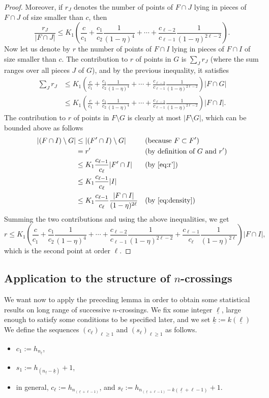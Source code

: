 \documentclass[10pt]{amsart}
\theoremstyle{definition}\newtheorem{defi}[theo]{Definition}\newtheorem{rema}[theo]{Remark}\newtheorem{exam}[theo]{Example}\newtheorem{exem}[theo]{Example}\newtheorem{nota}[theo]{Notation}
\newcommand{\egdef}{:=}
\newcommand{\lb}{\underline{\ell}}
\newcommand{\kb}{\underline{k}}
\begin{document}
\begin{proof}
Moreover, if $r_J$ denotes the number of points of $F\cap J$ lying in pieces of $F\cap J$ of size smaller than $c$, then
\[
\frac{r_J}{|F\cap J|} \le K_1\left(\frac{c}{c_1} + \frac{c_1}{c_2}
\frac{1}{(1-\eta)^4} + \cdots + \frac{c_{\ell-2}}{c_{\ell-1}}
\frac{1}{(1-\eta)^{2{\ell-2}}}\right).
\]
Now let us denote by $r$ the number of points of $F\cap I$ lying in pieces of $F\cap I$ of size smaller than $c$. The contribution to $r$ of points in $G$ is $\sum_J r_J$ (where the sum ranges over all pieces $J$ of $G$), and by the previous inequality, it satisfies
\begin{align*}
\sum_J r_J & \le K_1\left(\frac{c}{c_1} + \frac{c_1}{c_2} \frac{1}{(1-\eta)^4} + \cdots + \frac{c_{\ell-2}}{c_{\ell-1}}
\frac{1}{(1-\eta)^{2{\ell-2}}}\right) |F\cap G| \\
& \le K_1\left(\frac{c}{c_1} + \frac{c_1}{c_2}
\frac{1}{(1-\eta)^4} + \cdots + \frac{c_{\ell-2}}{c_{\ell-1}}
\frac{1}{(1-\eta)^{2{\ell-2}}}\right) |F\cap I|.
\end{align*}
The contribution to $r$ of points in $F\setminus G$ is clearly at most $|F\setminus G|$, which can be bounded above as follows
\begin{align*}
|(F\cap I)\setminus G| & \le |(F'\cap I)\setminus G| &&\text{(because $F\subset F'$)}\\
& = r' &&\text{(by definition of $G$ and $r'$)}\\
& \le K_1 \frac{c_{\ell-1}}{c_\ell}|F'\cap I| &&\text{(by~\eqref{eq:r'})}\\
& \le K_1 \frac{c_{\ell-1}}{c_\ell}|I| \\
& \le K_1 \frac{c_{\ell-1}}{c_\ell} \frac{|F\cap I|}{(1-\eta)^{2\ell}} &&\text{(by~\eqref{eq:density})}
\end{align*}
Summing the two contributions and using the above inequalities, we get
\[
r \le K_1\left(\frac{c}{c_1} + \frac{c_1}{c_2}
\frac{1}{(1-\eta)^4} + \cdots + \frac{c_{\ell-2}}{c_{\ell-1}}
\frac{1}{(1-\eta)^{2{\ell-2}}} + \frac{c_{\ell-1}}{c_\ell} \frac{1}{(1-\eta)^{2\ell}} \right) |F\cap I|,
\]
which is the second point at order $\ell$.
\end{proof}

\subsection{Application to the structure of \texorpdfstring{$n$}{n}-crossings}\label{sec:application}

We want now to apply the preceding lemma in order to obtain some statistical results on long range of successive $n$-crossings. We fix some integer $\lb$, large enough to satisfy some conditions to be specified later, and we set $\kb\egdef k(\lb)$ We define\pagebreak{} the sequences ${(c_\ell)}_{\ell\ge1}$ and ${(s_\ell)}_{\ell\ge1}$ as follows.
\begin{itemize}
\item $c_1\egdef h_{n_{\lb}}$,
\item $s_1\egdef h_{(n_{\lb}-\kb)}+1$,
\item in general, $c_\ell\egdef h_{n_{(\lb+\ell-1)}}$, and $s_\ell \egdef h_{n_{(\lb+\ell-1)}-k(\lb+\ell-1)} + 1$.
\end{itemize}
\end{document}
